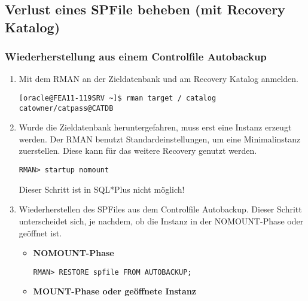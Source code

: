       \subsection{Verlust eines SPFile beheben (mit Recovery Katalog)}
        \subsubsection{Wiederherstellung aus einem Controlfile Autobackup}
          \begin{enumerate}
            \item Mit dem RMAN an der Zieldatenbank und am Recovery Katalog anmelden.
              \begin{lstlisting}[caption={An der Zieldatenbank und am Recovery Katalog anmelden},label=admin1405,language=rman]
[oracle@FEA11-119SRV ~]$ rman target / catalog catowner/catpass@CATDB
              \end{lstlisting}
            \item Wurde die Zieldatenbank heruntergefahren, muss erst eine Instanz erzeugt werden. Der RMAN benutzt Standardeinstellungen, um eine Minimalinstanz zuerstellen. Diese kann für das weitere Recovery genutzt werden.
              \begin{lstlisting}[caption={Zieldatenbank im RMAN in den NOMOUNT-Status bringen},label=admin1406,language=rman,alsolanguage=sqlplus]
RMAN> startup nomount
              \end{lstlisting}
              \begin{merke}
                Dieser Schritt ist in SQL*Plus nicht möglich!
              \end{merke}
            \item Wiederherstellen des SPFiles aus dem Controlfile Autobackup. Dieser Schritt unterscheidet sich, je nachdem, ob die Instanz in der NOMOUNT-Phase oder geöffnet ist.
              \begin{itemize}
                \item \textbf{NOMOUNT-Phase}
                  \begin{lstlisting}[caption={Wiederherstellen des SPFiles aus dem Controlfile Autobackup},label=admin1407,language=rman]
RMAN> RESTORE spfile FROM AUTOBACKUP;
                  \end{lstlisting}
                \item \textbf{MOUNT-Phase oder geöffnete Instanz}


\end{itemize}
\end{enumerate}
